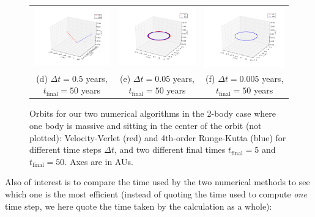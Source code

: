 \documentclass{article}
\begin{document}
\begin{multicols}{2}
\begin{figure}
\begin{center}
\begin{tabular}{ccc}
	\includegraphics[width=60mm]{Images/Earth-Sun/EarthSun_orbit_05_tfinal50.png}
	& \includegraphics[width=60mm]{Images/Earth-Sun/EarthSun_orbit_005_tfinal50.png}
	& \includegraphics[width=60mm]{Images/Earth-Sun/EarthSun_orbit_0005_tfinal50.png} \\
	
	(d) $\Delta t = 0.5$ years, $t_{\mathrm{final}} = 50$ years				&(e) $\Delta t = 0.05$ years, $t_{\mathrm{final}} = 50$ years 	& (f) $\Delta t = 0.005$ years, $t_{\mathrm{final}} = 50$ years  \\[6pt]
\end{tabular}
\caption{Orbits for our two numerical algorithms in the 2-body case where one body is massive and sitting in the center of the orbit (not plotted): Velocity-Verlet (red) and 4th-order Runge-Kutta (blue) for different time steps $\Delta t$, and two different final times $t_{\mathrm{final}} = 5$ and $t_{\mathrm{final}} = 50$. Axes are in AUs.}\label{fig:2_body}
\end{center}
\end{figure}
Also of interest is to compare the time used by the two numerical methods to see which one is the most efficient (instead of quoting the time used to compute \textit{one} time step, we here quote the time taken by the calculation as a whole):


\end{multicols}
\end{document}
